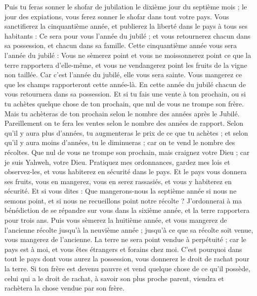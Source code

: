 \begin{multicols}{2}
Puis tu feras sonner le shofar de jubilation le dixième jour du septième mois ; le jour des expiations, vous ferez sonner le shofar dans tout votre pays.
Vous sanctifierez la cinquantième année, et publierez la liberté dans le pays à tous ses habitants : Ce sera pour vous l'année du jubilé ; et vous retournerez chacun dans sa possession, et chacun dans sa famille.
Cette cinquantième année vous sera l'année du jubilé : Vous ne sèmerez point et vous ne moissonnerez point ce que la terre rapportera d'elle-même, et vous ne vendangerez point les fruits de la vigne non taillée.
Car c'est l'année du jubilé, elle vous sera sainte. Vous mangerez ce que les champs rapporteront cette année-là.
En cette année du jubilé chacun de vous retournera dans sa possession.
Et si tu fais une vente à ton prochain, ou si tu achètes quelque chose de ton prochain, que nul de vous ne trompe son frère.
Mais tu achèteras de ton prochain selon le nombre des années après le Jubilé. Pareillement on te fera les ventes selon le nombre des années de rapport.
Selon qu'il y aura plus d'années, tu augmenteras le prix de ce que tu achètes ; et selon qu'il y aura moins d'années, tu le diminueras ; car on te vend le nombre des récoltes.
Que nul de vous ne trompe son prochain, mais craignez votre Dieu ; car je suis Yahweh, votre Dieu.
Pratiquez mes ordonnances, gardez mes lois et observez-les, et vous habiterez en sécurité dans le pays.
Et le pays vous donnera ses fruits, vous en mangerez, vous en serez rassasiés, et vous y habiterez en sécurité.
Et si vous dites : Que mangerons-nous la septième année si nous ne semons point, et si nous ne recueillons point notre récolte ?
J'ordonnerai à ma bénédiction de se répandre sur vous dans la sixième année, et la terre rapportera pour trois ans.
Puis vous sèmerez la huitième année, et vous mangerez de l'ancienne récolte jusqu'à la neuvième année ; jusqu'à ce que sa récolte soit venue, vous mangerez de l'ancienne.
La terre ne sera point vendue à perpétuité ; car le pays est à moi, et vous êtes étrangers et forains chez moi.
C'est pourquoi dans tout le pays dont vous aurez la possession, vous donnerez le droit de rachat pour la terre.
Si ton frère est devenu pauvre et vend quelque chose de ce qu'il possède, celui qui a le droit de rachat, à savoir son plus proche parent, viendra et rachètera la chose vendue par son frère.

\end{multicols}
